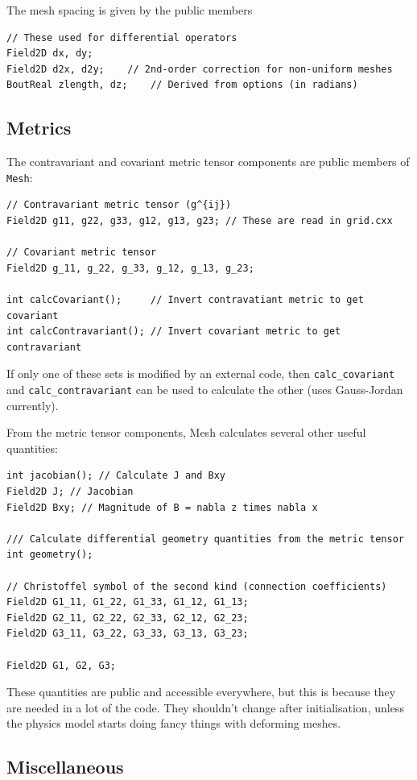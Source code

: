\documentclass[12pt]{article}
\newcommand{\code}[1]{\texttt{#1}}
\begin{document}
The mesh spacing is given by the public members
\begin{lstlisting}
// These used for differential operators 
Field2D dx, dy;
Field2D d2x, d2y;    // 2nd-order correction for non-uniform meshes		
BoutReal zlength, dz;    // Derived from options (in radians)
\end{lstlisting}

\subsection{Metrics}
The contravariant and covariant metric tensor components are
public members of \code{Mesh}: 
\begin{lstlisting}
// Contravariant metric tensor (g^{ij})
Field2D g11, g22, g33, g12, g13, g23; // These are read in grid.cxx

// Covariant metric tensor
Field2D g_11, g_22, g_33, g_12, g_13, g_23;

int calcCovariant();     // Invert contravatiant metric to get covariant
int calcContravariant(); // Invert covariant metric to get contravariant
\end{lstlisting}
If only one of these sets is modified by an external code, then
\code{calc\_covariant} and \code{calc\_contravariant} can be used
to calculate the other (uses Gauss-Jordan currently).

From the metric tensor components, Mesh calculates several other useful
quantities:
\begin{lstlisting}
int jacobian(); // Calculate J and Bxy
Field2D J; // Jacobian
Field2D Bxy; // Magnitude of B = nabla z times nabla x

/// Calculate differential geometry quantities from the metric tensor
int geometry();

// Christoffel symbol of the second kind (connection coefficients)
Field2D G1_11, G1_22, G1_33, G1_12, G1_13;
Field2D G2_11, G2_22, G2_33, G2_12, G2_23;
Field2D G3_11, G3_22, G3_33, G3_13, G3_23;
  
Field2D G1, G2, G3;
\end{lstlisting}

These quantities are public and accessible everywhere, but this is because
they are needed in a lot of the code. They shouldn't change
after initialisation, unless the physics model starts doing fancy things with
deforming meshes.

\subsection{Miscellaneous}
\end{document}
